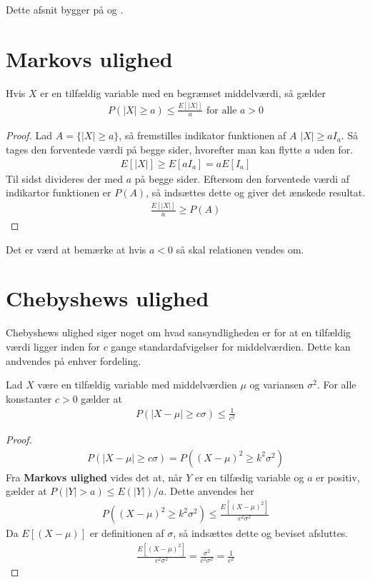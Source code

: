 Dette afsnit bygger på \cite{sandsynlighedsBog} og \cite{grimsandsynlighedsBog}.
\section{Markovs ulighed}
\begin{theorem}
Hvis $X$ er en tilfældig variable med en begrænset middelværdi, så gælder
\begin{align*}
    P(|X|\geq a) \leq \frac{E[|X|]}{a} \text{ for alle } a > 0
\end{align*}
\end{theorem}
\begin{proof}
Lad $A=\{|X|\geq a\}$, så fremstilles indikator funktionen af $A$ $|X|\geq aI_a$. Så tages den forventede værdi på begge sider, hvorefter man kan flytte $a$ uden for.
\begin{align*}
E[|X|]\geq E[aI_a] = a E[I_a]
\end{align*} 
Til sidst divideres der med $a$ på begge sider. Eftersom den forventede værdi af indikartor funktionen er $P(A)$, så indsættes dette og giver det ænskede resultat.
\begin{align*}
    \frac{E[|X|]}{a} \geq P(A)
\end{align*} 
\end{proof}
Det er værd at bemærke at hvis $a<0$ så skal relationen vendes om.

\section{Chebyshews ulighed}
Chebyshews ulighed siger noget om hvad sansyndligheden er for at en tilfældig værdi ligger inden for $c$ gange standardafvigelser for middelværdien. Dette kan andvendes på enhver fordeling. 
\begin{theorem}
    Lad $X$ være en tilfældig variable med middelværdien $\mu$ og variansen $\sigma^2$. For alle konstanter $c>0$ gælder at 
    \begin{align*}
        P(|X-\mu|\geq c \sigma)\leq \frac{1}{c^2}
    \end{align*} 
\end{theorem}
\begin{proof}%
    \begin{align*}
        P(|X-\mu|\geq c \sigma)=P((X-\mu)^2\geq k^2\sigma^2)
    \end{align*}
Fra \textbf{Markovs ulighed} vides det at, når $Y$ er en tilfædig variable og $a$ er positiv, gælder at $P(|Y|>a)\leq E(|Y|)/a$. Dette anvendes her
\begin{align*}
    P((X-\mu)^2\geq k^2\sigma^2) \leq \frac{E[(X-\mu)^2]}{c^2\sigma^2}
\end{align*}
Da $E[(X-\mu)]$ er definitionen af $\sigma$, så indsættes dette og beviset afsluttes.
\begin{align*}
    \frac{E[(X-\mu)^2]}{c^2\sigma^2} = \frac{\sigma^2}{c^2\sigma^2} = \frac{1}{c^2}
\end{align*}
\end{proof}
